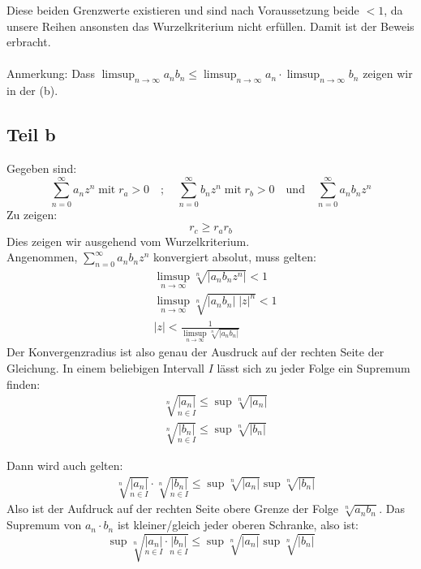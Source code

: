 \documentclass[a4paper,german,12pt,smallheadings]{scrartcl}
\begin{document}
Diese beiden Grenzwerte existieren und sind nach Voraussetzung beide $<1$, da unsere Reihen ansonsten das Wurzelkriterium nicht erfüllen. Damit ist der Beweis erbracht.\\
\\
Anmerkung: Dass $\limsup_{n \to \infty} a_nb_n \leq \limsup_{n \to \infty} a_n \cdot \limsup_{n \to \infty} b_n$ zeigen wir in der (b).

\subsection*{Teil b}

Gegeben sind:
\begin{equation*}
\sum\limits_{n=0}^{\infty} a_n z^n \; \text{mit} \; r_a>0\quad ; \quad \sum\limits_{n=0}^{\infty} b_n z^n \; \text{mit} \; r_b>0 \quad \text{und} \quad  \sum\limits_{n=0}^{\infty} a_n b_n z^n
\end{equation*}
Zu zeigen:
\begin{equation*}
r_c \geq r_a r_b
\end{equation*}
Dies zeigen wir ausgehend vom Wurzelkriterium.\\
Angenommen, $\sum\limits_{n=0}^{\infty} a_n b_n z^n$ konvergiert absolut, muss gelten:
\begin{align*}
  & \limsup\limits_{n \to \infty} \sqrt[n]{|a_n b_n z^n|} < 1 \\
  & \limsup\limits_{n \to \infty} \sqrt[n]{|a_n b_n| \; |z|^n} < 1\\
  & |z| < \frac{1}{\limsup\limits_{n \to \infty} \sqrt[n]{|a_n b_n|}}
\end{align*}
Der Konvergenzradius ist also genau der Ausdruck auf der rechten Seite der Gleichung. In einem beliebigen Intervall $I$ lässt sich zu jeder Folge ein Supremum finden:
\begin{align*}
  & \sqrt[n]{\underset{n \in I}{|a_n|}} \leq \sup \sqrt[n]{|a_n|}\\
  & \sqrt[n]{\underset{n \in I}{|b_n|}} \leq \sup \sqrt[n]{|b_n|}
\end{align*}

Dann wird auch gelten:
\begin{align*} 
  & \sqrt[n]{\underset{n \in I}{|a_n|}} \cdot \sqrt[n]{\underset{n \in I}{|b_n|}} \leq \sup \sqrt[n]{|a_n|} \sup \sqrt[n]{|b_n|}
\end{align*}
Also ist der Aufdruck auf der rechten Seite obere Grenze der Folge $\sqrt[n]{a_n b_n}$. Das Supremum von $a_n \cdot b_n$ ist kleiner/gleich jeder oberen Schranke, also ist:
\begin{equation*}
\sup \sqrt[n]{\underset{n \in I}{|a_n|} \cdot \underset{n \in I}{|b_n|}} \leq \sup \sqrt[n]{|a_n|} \sup \sqrt[n]{|b_n|}
\end{equation*}
\end{document}
